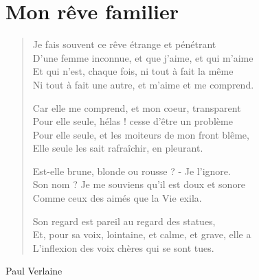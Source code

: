 ﻿\documentclass[12pt, a4paper]{report}
\begin{document}
        \section*{Mon rêve familier}
        \beginnumbering
        \pstart
        \begin{verse}
        Je fais souvent ce rêve étrange et pénétrant\\
D'une femme inconnue, et que j'aime, et qui m'aime\\
Et qui n'est, chaque fois, ni tout à fait la même\\
Ni tout à fait une autre, et m'aime et me comprend.

Car elle me comprend, et mon coeur, transparent\\
Pour elle seule, hélas ! cesse d'être un problème\\
Pour elle seule, et les moiteurs de mon front blême,\\
Elle seule les sait rafraîchir, en pleurant.

Est-elle brune, blonde ou rousse ? - Je l'ignore.\\
Son nom ? Je me souviens qu'il est doux et sonore\\
Comme ceux des aimés que la Vie exila.

Son regard est pareil au regard des statues,\\
Et, pour sa voix, lointaine, et calme, et grave, elle a\\
L'inflexion des voix chères qui se sont tues.




        \end{verse}
        \pend
        \endnumbering
        \begin{flushright}
        Paul Verlaine
        \end{flushright}
        
\end{document}
